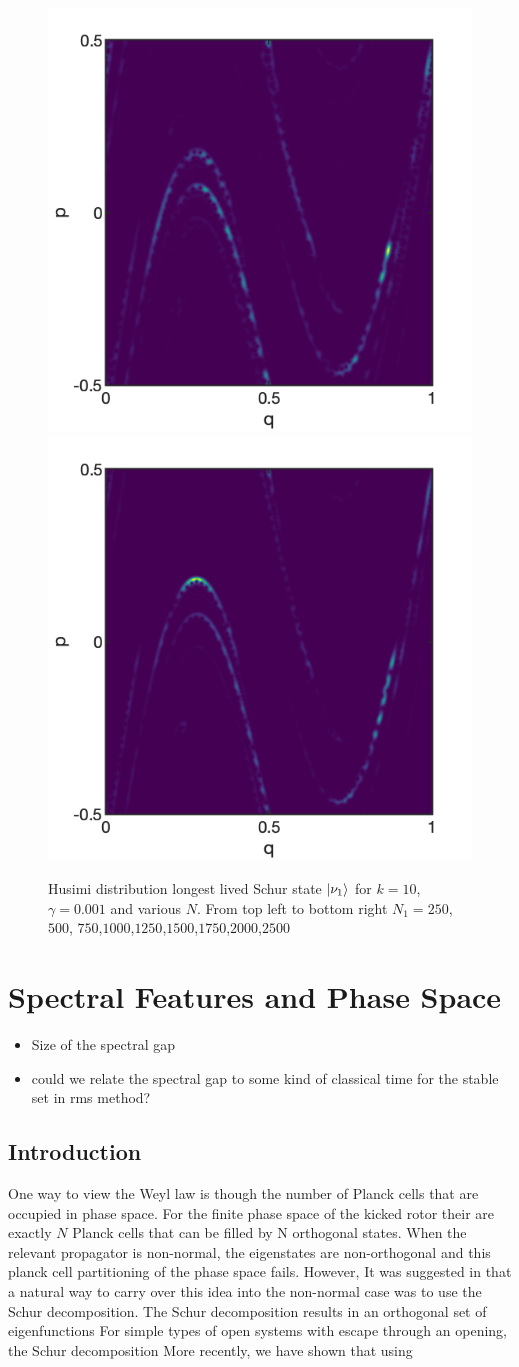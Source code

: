 \documentclass{iopart}
\begin{document}
\begin{figure}[h!]
	{\includegraphics[width=0.24\columnwidth]{ HusG_k10_g0p001_N4001_longest_lived_2x3}}
	{\includegraphics[width=0.24\columnwidth]{ HusG_k10_g0p001_N5001_longest_lived_2x3}}
	
	\caption{Husimi distribution longest lived Schur state $\ket{\nu_1}$ for $k=10$, $\gamma=0.001$ and various $N$. From top left to bottom right $N_1=250$, $500$, $750$,$1000$,$1250$,$1500$,$1750$,$2000$,$2500$}
	\label{fig:ptkr_husimi_k10_longest}
\end{figure}



%
%	


\section{Spectral Features and Phase Space}

\begin{itemize}
	\item Size of the spectral gap
	\item could we relate the spectral gap to some kind of classical time for the stable set in rms method?
\end{itemize}

\subsection{Introduction}

One way to view the Weyl law is though the number of Planck cells that are occupied in phase space. For the finite phase space of the kicked rotor their are exactly $N$ Planck cells that can be filled by N orthogonal states.  When the relevant propagator is non-normal, the eigenstates are non-orthogonal and this planck cell partitioning of the phase space fails. However, It was suggested in \cite{Henning_2010_frac_weyl} that a natural way to carry over this idea into the non-normal case was to use the Schur decomposition. The Schur decomposition results in an orthogonal set of eigenfunctions For simple types of open systems with escape through an opening, the Schur decomposition  More recently, we have shown that using 
\end{document}

